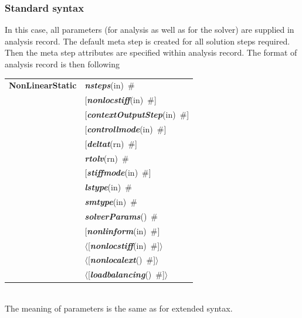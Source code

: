 \documentclass[a4paper]{article}
\makeatletter
\newcommand{\keywordnotype}[1]{\mbox{{\it{\bf{#1}}}}}
\newcommand{\keyword}[2]{\mbox{{\keywordnotype{#1}\tiny (#2)}}}
\newcommand{\entKeywordInst}[1]{\mbox{{\bf{{#1}}}}}
\newcommand{\field}[2]{\mbox{\keyword{#1}{#2}~\#}}
\newcommand{\optField}[2]{\mbox{[\field{#1}{#2}]}}
\newcommand{\PoptField}[2]{\mbox{$\langle$[\field{#1}{#2}]$\rangle$}}
\newenvironment{record}[1][]{\begin{tabular}{|ll}}{\end{tabular}\\}
\newcommand{\recentry}[2]{{#1}&{#2}\\}
\newcounter{rcc}
\newenvironment{record}[1][\textwidth]{\setcounter{rcc}{0}\begin{tabular*}{#1}{|ll@{\extracolsep{\fill}}r}}{\end{tabular*}\\}
\newcommand{\recentry}[2]{\ifthenelse{\value{rcc}>0}{&$\backslash$ \\}{\setcounter{rcc}{1}}{#1}&{#2}}
\makeatother
\begin{document}
\subsubsection{Standard syntax}
In this case, all parameters (for analysis as well as for the solver)
are supplied in analysis record. The default meta step is created for
all solution steps required. Then the meta step attributes are
specified within analysis record. The format of analysis record is
then following\\

\noindent
\begin{record}
\recentry{\entKeywordInst{NonLinearStatic}}{\field{nsteps}{in}}
\recentry{}{\optField{nonlocstiff}{in}}
\recentry{}{\optField{contextOutputStep}{in}} \recentry{}{\optField{controllmode}{in}}
\recentry{}{\optField{deltat}{rn}}
\recentry{}{\field{rtolv}{rn}} \recentry{}{\optField{stiffmode}{in}} \recentry{}{\field{lstype}{in}}
\recentry{}{\field{smtype}{in}} \recentry{}{\field{solverParams}{}}
\recentry{}{\optField{nonlinform}{in}}
\recentry{}{\PoptField{nonlocstiff}{in}}
\recentry{}{\PoptField{nonlocalext}{}} \recentry{}{\PoptField{loadbalancing}{}}
\end{record}
The meaning of parameters is the same as for extended syntax.

%
\end{document}
